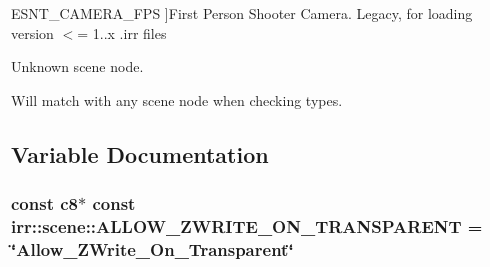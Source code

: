 \begin{Desc}
\begin{description}
{E\+S\+N\+T\+\_\+\+C\+A\+M\+E\+R\+A\+\_\+\+F\+PS\hypertarget{namespaceirr_1_1scene_acad3d7ef92a9807d391ba29120f3b7bdacbc402c4f01adcc87f3f8e9c004bdcd6}{}\label{namespaceirr_1_1scene_acad3d7ef92a9807d391ba29120f3b7bdacbc402c4f01adcc87f3f8e9c004bdcd6}
}]First Person Shooter Camera. Legacy, for loading version $<$= 1..\+x .irr files \item[{\em 
E\+S\+N\+T\+\_\+\+U\+N\+K\+N\+O\+WN\hypertarget{namespaceirr_1_1scene_acad3d7ef92a9807d391ba29120f3b7bda0c24ab203e5e0dc055f82fbca65d4f47}{}\label{namespaceirr_1_1scene_acad3d7ef92a9807d391ba29120f3b7bda0c24ab203e5e0dc055f82fbca65d4f47}
}]Unknown scene node. \item[{\em 
E\+S\+N\+T\+\_\+\+A\+NY\hypertarget{namespaceirr_1_1scene_acad3d7ef92a9807d391ba29120f3b7bdaa61d9ba5a5ec51a33600f83fb8bd71f5}{}\label{namespaceirr_1_1scene_acad3d7ef92a9807d391ba29120f3b7bdaa61d9ba5a5ec51a33600f83fb8bd71f5}
}]Will match with any scene node when checking types. \end{description}
\end{Desc}


\subsection{Variable Documentation}
\subsubsection[{\texorpdfstring{A\+L\+L\+O\+W\+\_\+\+Z\+W\+R\+I\+T\+E\+\_\+\+O\+N\+\_\+\+T\+R\+A\+N\+S\+P\+A\+R\+E\+NT}{ALLOW\_ZWRITE\_ON\_TRANSPARENT}}]{\setlength{\rightskip}{0pt plus 5cm}const {\bf c8}$\ast$ const irr\+::scene\+::\+A\+L\+L\+O\+W\+\_\+\+Z\+W\+R\+I\+T\+E\+\_\+\+O\+N\+\_\+\+T\+R\+A\+N\+S\+P\+A\+R\+E\+NT = \char`\"{}Allow\+\_\+\+Z\+Write\+\_\+\+On\+\_\+\+Transparent\char`\"{}}\hypertarget{namespaceirr_1_1scene_ab585d23bc2a3d02cd368d8bfd0b1414a}{}\label{namespaceirr_1_1scene_ab585d23bc2a3d02cd368d8bfd0b1414a}


